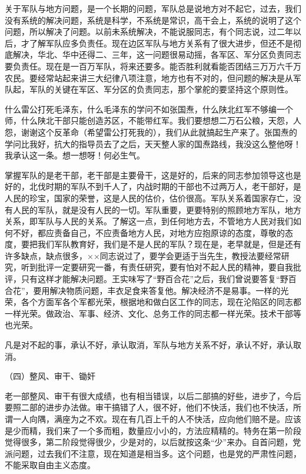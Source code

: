 关于军队与地方问题，是一个长期的问题，军队总是说地方对不起它，过去，我们没有系统的解决问题，系统是科学，不系统是常识，高干会上，系统的说明了这个问题，所以解决了问题。以前未系统解决，不能说服同志，有个同志说，过二年以后，才了解军队应多负责任。现在边区军队与地方关系有了很大进步，但还不是彻底解决，华北、华中还得二、三年，这一问题很易动摇，各军区、军分区负责同志要负责任。现在是一百万军队，将来还要多。能否胜利就看能否团结三万万六千万农民。要经常站起来讲三大纪律八项注意，地方也有不对的，但问题的解决是从军队起，军队的关键在军区、军分区的负责同志，那个掌舵的要坚持这个原则性。

什么雷公打死毛泽东，什么毛泽东的学问不如张国焘，什么陕北红军不够编一个师，什么陕北干部只能创造苏区，不能带红军。我们要想想二万石公粮，天怨，人怨，谢谢这个反革命（希望雷公打死我的），我们从此就搞起生产来了。张国焘的学问比我好，抗大的指导员去了之后，天天整人家的国焘路线，我没这么整他呀！我承认这一条。想一想呀！何必生气。

掌握军队的是老干部，老干部是主要骨干，这是好的，后来的同志参加领导这也是好的，北伐时期的军队不到千人了，内战时期的干部也不过两万人，老干部好，是人民的珍宝，国家的荣誉，这是人民的估价，估价很高。军队关系着国家存亡，没有人民的军队，就是没有人民的一切。军队重要，更要特别的照顾地方军队，地方关系，即军队与人民的关系。了解这一点，到任何地方去，不管地方人民对我们如何不好，都应责备自己，不应责备地方人民，对地方应抱原谅的态度，尊敬的态度，要把我们军队教育好，我们是不是人民的军队？现在是，老早就是，但是还有许多缺点，缺点很多，××同志说过了，要学会更适于当先生，教授法要经常研究，听到批评一定要研究一番，有责任研究，要有怕对不起人民的精神，要自我批评，只有这样才能解决问题。王实味写了“野百合花”之后，我们曾说要答复“野百合花”，要用解决物质问题，丰衣足食来答复他。解决经济不是易事。一样的光荣，各个方面军各个军都光荣，根据地和做白区工作的同志，现在沦陷区的同志都一样光荣。做政治、军事、经济、文化、总务工作的同志都一样光荣。技术干部等也光荣。

凡是对不起的事，承认不好，承认取消，军队与地方关系不好，承认不好，承认取消。

（四）整风、审干、锄奸

老一部整风、审干有很大成绩，也有相当错误，以后二部搞的好些，进步了，今后要照二部的进步办法做。审干搞错了人，很不好，他们不快活，我们也不快活，所谓一人向隅，满座为之不欢。现在有几百上千的人不快活，应向他们赔不是。应该是少而精，我们来了一个多而粗，数量应小小的，方法应精精的。特务在第一阶段觉得很多，第二阶段觉得很少，少是对的，以后就按这条“少”来办。自首问题，党派问题，过去我们不注意，现在知道是相当多。这个问题，也是党的严肃性问题，不能采取自由主义态度。

